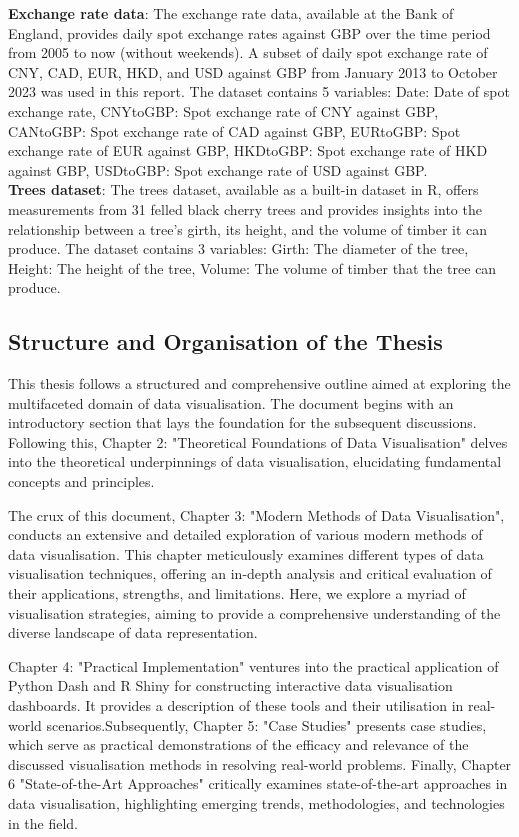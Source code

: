 \documentclass{article}\usepackage[]{graphicx}\usepackage[]{xcolor}
\begin{document}
\noindent
\textbf{Exchange rate data}: The exchange rate data, available at the Bank of England, provides daily spot exchange rates against GBP over the time period from 2005 to now (without weekends). A subset of daily spot exchange rate of CNY, CAD, EUR, HKD, and USD against GBP from January 2013 to October 2023 was used in this report. The dataset contains 5 variables: Date: Date of spot exchange rate, CNYtoGBP: Spot exchange rate of CNY against GBP, CANtoGBP: Spot exchange rate of CAD against GBP, EURtoGBP: Spot exchange rate of EUR against GBP, HKDtoGBP: Spot exchange rate of HKD against GBP, USDtoGBP: Spot exchange rate of USD against GBP.\\

\noindent
\textbf{Trees dataset}: The trees dataset, available as a built-in dataset in R, offers measurements from 31 felled black cherry trees and provides insights into the relationship between a tree's girth, its height, and the volume of timber it can produce. The dataset contains 3 variables: Girth: The diameter of the tree, Height: The height of the tree, Volume: The volume of timber that the tree can produce.\\

\subsection{Structure and Organisation of the Thesis}
This thesis follows a structured and comprehensive outline aimed at exploring the multifaceted domain of data visualisation. The document begins with an introductory section that lays the foundation for the subsequent discussions. Following this, Chapter 2: "Theoretical Foundations of Data Visualisation" delves into the theoretical underpinnings of data visualisation, elucidating fundamental concepts and principles.

The crux of this document, Chapter 3: "Modern Methods of Data Visualisation", conducts an extensive and detailed exploration of various modern methods of data visualisation. This chapter meticulously examines different types of data visualisation techniques, offering an in-depth analysis and critical evaluation of their applications, strengths, and limitations. Here, we explore a myriad of visualisation strategies, aiming to provide a comprehensive understanding of the diverse landscape of data representation.

Chapter 4: "Practical Implementation" ventures into the practical application of Python Dash and R Shiny for constructing interactive data visualisation dashboards. It provides a description of these tools and their utilisation in real-world scenarios.Subsequently, Chapter 5: "Case Studies" presents case studies, which serve as practical demonstrations of the efficacy and relevance of the discussed visualisation methods in resolving real-world problems. Finally, Chapter 6 "State-of-the-Art Approaches" critically examines state-of-the-art approaches in data visualisation, highlighting emerging trends, methodologies, and technologies in the field.
\end{document}
